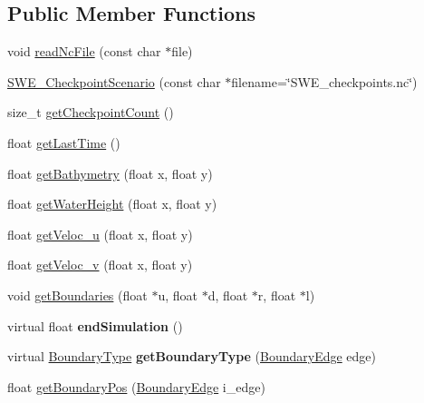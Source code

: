 \subsection*{Public Member Functions}
\begin{DoxyCompactItemize}
\item 
void \hyperlink{classSWE__CheckpointScenario_a054b45cc31258a744600ce570e433209}{read\-Nc\-File} (const char $\ast$file)
\item 
\hyperlink{classSWE__CheckpointScenario_a9e0365c320f4f78bd0f6072d48b0adfd}{S\-W\-E\-\_\-\-Checkpoint\-Scenario} (const char $\ast$filename=\char`\"{}S\-W\-E\-\_\-checkpoints.\-nc\char`\"{})
\item 
size\-\_\-t \hyperlink{classSWE__CheckpointScenario_a4eb6d0fb1e842d3ca9ba8408dd9f3aa2}{get\-Checkpoint\-Count} ()
\item 
float \hyperlink{classSWE__CheckpointScenario_a9b8c9485e5023a75eb6bce03cd15f98c}{get\-Last\-Time} ()
\item 
float \hyperlink{classSWE__CheckpointScenario_a2515a1c9104a225f07737cc9f1e731ad}{get\-Bathymetry} (float x, float y)
\item 
float \hyperlink{classSWE__CheckpointScenario_acd8cae64d2a4098cb3bd68d0a03f286b}{get\-Water\-Height} (float x, float y)
\item 
float \hyperlink{classSWE__CheckpointScenario_a3d04068373de76e97f150d2829b029b5}{get\-Veloc\-\_\-u} (float x, float y)
\item 
float \hyperlink{classSWE__CheckpointScenario_a774a87a27adf6bc855f3ab21d4243ad2}{get\-Veloc\-\_\-v} (float x, float y)
\item 
void \hyperlink{classSWE__CheckpointScenario_a49face4d71e960656d78b5525318bbd1}{get\-Boundaries} (float $\ast$u, float $\ast$d, float $\ast$r, float $\ast$l)
\item 
\hypertarget{classSWE__CheckpointScenario_ad8903d3a88c515a8fd720299adae5097}{virtual float {\bfseries end\-Simulation} ()}\label{classSWE__CheckpointScenario_ad8903d3a88c515a8fd720299adae5097}

\item 
\hypertarget{classSWE__CheckpointScenario_acfc8c2cccbdd62e605d092678456250f}{virtual \hyperlink{SWE__Scenario_8hh_af75d5dd7322fa39ed0af4e7839e600f8}{Boundary\-Type} {\bfseries get\-Boundary\-Type} (\hyperlink{SWE__Scenario_8hh_aa5e01e3f7df312f7b9b0d02521141fcc}{Boundary\-Edge} edge)}\label{classSWE__CheckpointScenario_acfc8c2cccbdd62e605d092678456250f}

\item 
float \hyperlink{classSWE__CheckpointScenario_a1efa5054f7699258076ca843c30a18fb}{get\-Boundary\-Pos} (\hyperlink{SWE__Scenario_8hh_aa5e01e3f7df312f7b9b0d02521141fcc}{Boundary\-Edge} i\-\_\-edge)
\end{DoxyCompactItemize}
